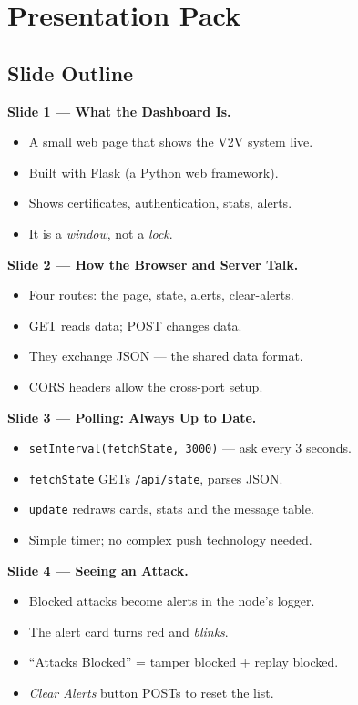 \documentclass[11pt,a4paper]{report}
\begin{document}
\section{Presentation Pack}

\subsection{Slide Outline}

\textbf{Slide 1 --- What the Dashboard Is.}
\begin{itemize}
  \item A small web page that shows the V2V system live.
  \item Built with Flask (a Python web framework).
  \item Shows certificates, authentication, stats, alerts.
  \item It is a \emph{window}, not a \emph{lock}.
\end{itemize}

\textbf{Slide 2 --- How the Browser and Server Talk.}
\begin{itemize}
  \item Four routes: the page, state, alerts, clear-alerts.
  \item GET reads data; POST changes data.
  \item They exchange JSON --- the shared data format.
  \item CORS headers allow the cross-port setup.
\end{itemize}

\textbf{Slide 3 --- Polling: Always Up to Date.}
\begin{itemize}
  \item \texttt{setInterval(fetchState, 3000)} --- ask every 3 seconds.
  \item \texttt{fetchState} GETs \texttt{/api/state}, parses JSON.
  \item \texttt{update} redraws cards, stats and the message table.
  \item Simple timer; no complex push technology needed.
\end{itemize}

\textbf{Slide 4 --- Seeing an Attack.}
\begin{itemize}
  \item Blocked attacks become alerts in the node's logger.
  \item The alert card turns red and \emph{blinks}.
  \item ``Attacks Blocked'' = tamper blocked + replay blocked.
  \item \emph{Clear Alerts} button POSTs to reset the list.
\end{itemize}
\end{document}
